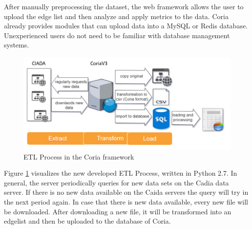 \documentclass[conference, 11pt]{IEEEtran}
\begin{document}
After manually preprocessing the dataset, the web framework allows the user to upload the edge list and then analyze and apply metrics to the data.
Coria already provides modules that can upload data into a MySQL or Redis database. Unexperienced users do not need to be familiar with database management systems. \linebreak




\vspace{0.5cm}
\begin{figure}[htbp]
\centerline{\includegraphics[scale=0.4]{Graphics/ETL2.PNG}}
\caption{ETL Process in the Coria framework}
\label{fig:1}
\end{figure}
\vspace{0.5cm}

Figure \ref{fig:1} visualizes the new developed ETL Process, written in Python 2.7. In general, the server periodically queries for new data sets on the Cadia data server. If there is no new data available on the Caida servers the query will try in the next period again. 
In case that there is new data available, every new file will be downloaded. After downloading a new file, it will be transformed into an edgelist and then be uploaded to the database of Coria.
\linebreak
\linebreak
\end{document}

